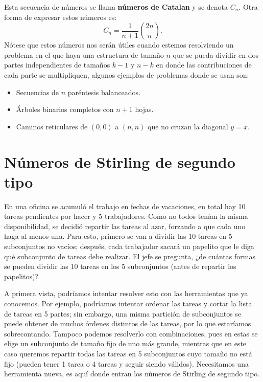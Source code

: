 Esta secuencia de números se llama \textbf{números de Catalan} y se denota $C_n$. Otra forma de expresar estos números es:
\[
C_n = \frac{1}{n+1}\binom{2n}{n}.
\]
Nótese que estos números nos serán útiles cuando estemos resolviendo un problema en el que haya una estructura de tamaño $n$ que se pueda dividir en dos partes independientes de tamaños $k-1$ y $n-k$ en donde las contribuciones de cada parte se multipliquen, algunos ejemplos de problemas donde se usan son:
\begin{itemize}
    \item Secuencias de $n$ paréntesis balanceados.
    \item Árboles binarios completos con $n+1$ hojas.
    \item Caminos reticulares de $(0,0)$ a $(n,n)$ que no cruzan la diagonal $y=x$.
\end{itemize}
\section{Números de Stirling de segundo tipo\adv}
 
En una oficina se acumuló el trabajo en fechas de vacaciones, en total hay 10 tareas pendientes por hacer y 5 trabajadores. Como no todos tenían la misma disponibilidad, se decidió repartir las tareas al azar, forzando a que cada uno haga al menos una. Para esto, primero se van a dividir las 10 tareas en 5 subconjuntos no vacíos; después, cada trabajador sacará un papelito que le diga qué subconjunto de tareas debe realizar. El jefe se pregunta, ¿de cuántas formas se pueden dividir las 10 tareas en los 5 subconjuntos (antes de repartir los papelitos)?

A primera vista, podríamos intentar resolver esto con las herramientas que ya conocemos. Por ejemplo, podríamos intentar ordenar las tareas y cortar la lista de tareas en 5 partes; sin embargo, una misma partición de subconjuntos se puede obtener de muchos órdenes distintos de las tareas, por lo que estaríamos sobrecontando. Tampoco podemos resolverlo con combinaciones, pues en estas se elige un subconjunto de tamaño fijo de uno más grande, mientras que en este caso queremos repartir todas las tareas en 5 subconjuntos cuyo tamaño no está fijo (pueden tener 1 tarea o 4 tareas y seguir siendo válidos). Necesitamos una herramienta nueva, es aquí donde entran los números de Stirling de segundo tipo.

